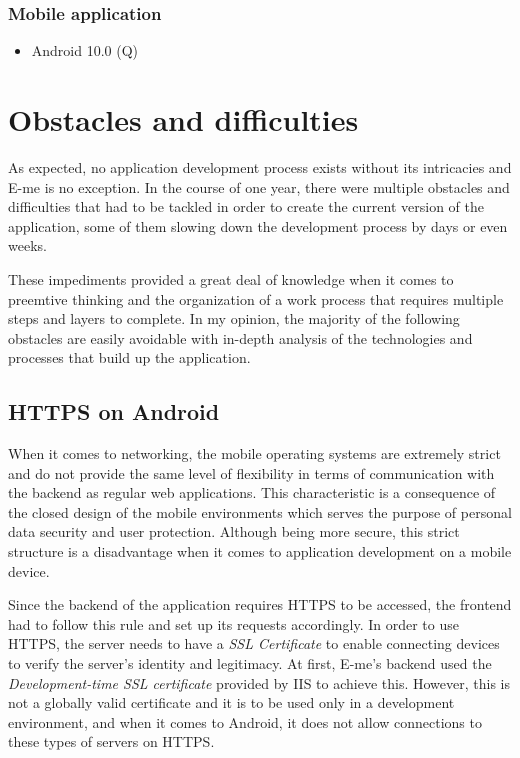 \subsubsection{Mobile application}

\begin{itemize}
	\item Android 10.0 (Q)
\end{itemize}

\section{Obstacles and difficulties}

As expected, no application development process exists without its intricacies and E-me is no exception.
In the course of one year, there were multiple obstacles and difficulties that had to be tackled in order to create the current version of the application,
some of them slowing down the development process by days or even weeks.

These impediments provided a great deal of knowledge when it comes to preemtive thinking and the organization of a work process that requires multiple
steps and layers to complete.
In my opinion, the majority of the following obstacles are easily avoidable with in-depth analysis of the technologies and processes that build up the application.

\subsection{HTTPS on Android}

When it comes to networking, the mobile operating systems are extremely strict and do not provide the same level of flexibility in terms of 
communication with the backend as regular web applications.
This characteristic is a consequence of the closed design of the mobile environments which serves the purpose of personal data security and user protection.
Although being more secure, this strict structure is a disadvantage when it comes to application development on a mobile device.

Since the backend of the application requires HTTPS to be accessed, the frontend had to follow this rule and set up its requests accordingly.
In order to use HTTPS, the server needs to have a \emph{SSL Certificate} to enable connecting devices to verify the server's identity and legitimacy.
At first, E-me's backend used the \emph{Development-time SSL certificate} provided by IIS to achieve this.
However, this is not a globally valid certificate and it is to be used only in a development environment, and when it comes to Android, it does not
allow connections to these types of servers on HTTPS.

